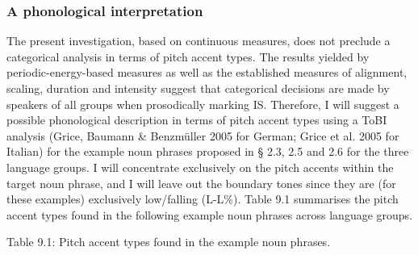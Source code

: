 \subsubsection{A phonological interpretation}
\hypertarget{Toc191305920}{}\begin{styleStandard}
The present investigation, based on continuous measures, does not preclude a categorical analysis in terms of pitch accent types. The results yielded by periodic-energy-based measures as well as the established measures of alignment, scaling, duration and intensity suggest that categorical decisions are made by speakers of all groups when prosodically marking IS. Therefore, I will suggest a possible phonological description in terms of pitch accent types using a ToBI analysis (Grice, Baumann \& Benzmüller 2005 for German; Grice et al. 2005 for Italian) for the example noun phrases proposed in § 2.3, 2.5 and 2.6 for the three language groups. I will concentrate exclusively on the pitch accents within the target noun phrase, and I will leave out the boundary tones since they are (for these examples) exclusively low/falling (L-L\%). Table 9.1 summarises the pitch accent types found in the following example noun phrases across language groups.
\end{styleStandard}

\begin{stylelsTableHeading}
Table 9.1: Pitch accent types found in the example noun phrases.
\end{stylelsTableHeading}

